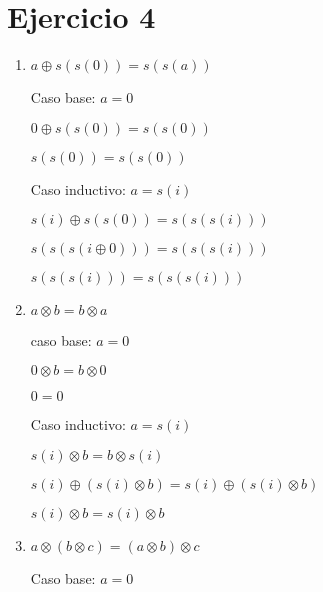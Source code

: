 \documentclass{article}
\begin{document}
\section{Ejercicio 4}
\begin{enumerate}
    \item $a \oplus s(s(0)) = s(s(a))$
\begin{center}
    Caso base: $a = 0$
\end{center}
\begin{center}
    $0\oplus s(s(0)) = s(s(0))$
\end{center}
\begin{center}
    $s(s(0)) = s(s(0))$
\end{center}
\begin{center}
    Caso inductivo: $a = s(i)$
\end{center}
\begin{center}
    $s(i) \oplus s(s(0)) = s(s(s(i)))$
\end{center}
\begin{center}
    $s(s(s(i \oplus 0))) = s(s(s(i)))$
\end{center}
\begin{center}
    $s(s(s(i))) = s(s(s(i)))$
\end{center}
    \item $a \otimes b = b \otimes a$
\begin{center}
    caso base: $a = 0$
\end{center}
\begin{center}
    $0 \otimes b = b \otimes 0$
\end{center}
\begin{center}
    $0 = 0$
\end{center}
\begin{center}
    Caso inductivo: $a = s(i)$
\end{center}
\begin{center}
    $s(i) \otimes b = b \otimes s(i)$
\end{center}
\begin{center}
    $s(i) \oplus (s(i) \otimes b) = s(i) \oplus (s(i) \otimes b)$
\end{center}
\begin{center}
    $s(i) \otimes b = s(i) \otimes b$
\end{center}
    \item $a \otimes (b \otimes c) = (a \otimes b) \otimes c$
\begin{center}
    Caso base: $a = 0$
\end{center}

\end{enumerate}
\end{document}
